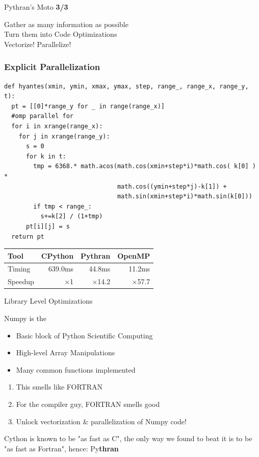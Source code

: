 \documentclass[aspectratio=1610]{beamer}
\begin{document}
\begin{frame}{Pythran's Moto \textbf{3/3}}
    \begin{center}
Gather as many information as possible\\
\vfill
Turn them into Code Optimizations\\
\vfill
\Large Vectorize! Parallelize!
\end{center}
\end{frame}

\begin{frame}[fragile]
    \frametitle{Explicit Parallelization}
            \begin{lstlisting}[basicstyle=\ttfamily\scriptsize]
def hyantes(xmin, ymin, xmax, ymax, step, range_, range_x, range_y, t):
  pt = [[0]*range_y for _ in range(range_x)]
  #omp parallel for
  for i in xrange(range_x):
    for j in xrange(range_y):
      s = 0
      for k in t:
        tmp = 6368.* math.acos(math.cos(xmin+step*i)*math.cos( k[0] ) *
                               math.cos((ymin+step*j)-k[1]) +
                               math.sin(xmin+step*i)*math.sin(k[0]))
        if tmp < range_:
          s+=k[2] / (1+tmp)
      pt[i][j] = s
  return pt
\end{lstlisting}
\vfill
    \begin{tabular}{|l|r|r|r|}
        \hline
     Tool    &  CPython    &   Pythran     & OpenMP   \\
    \hline
     Timing  &  639.0ms    &   44.8ms       &      11.2ms       \\
    \hline
     Speedup &  $\times$1         &    $\times$14.2      &    $\times$57.7   \\
    \hline
\end{tabular}
\end{frame}

\begin{frame}{Library Level Optimizations}
    \begin{block}{Numpy is the }
        \begin{itemize}
            \item Basic block of Python Scientific Computing
            \item High-level Array Manipulations
            \item Many common functions implemented
        \end{itemize}
    \end{block}
    \begin{enumerate}
        \item This smells like FORTRAN
        \item For the compiler guy, FORTRAN smells good
        \item Unlock vectorization \& parallelization of Numpy code!
    \end{enumerate}
    
    \vfill
    \begin{center}
    \scriptsize{Cython is known to be "as fast as C", the only way we found to beat it is to be "as fast as Fortran", hence: Py\textbf{thran}}
    \end{center}
    
\end{frame}
\end{document}
